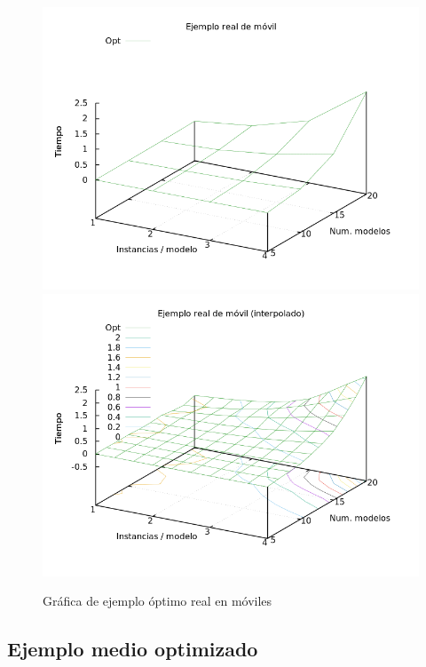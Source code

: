 \begin{figure}[H]
\centering
\includegraphics[scale=0.5]{img/opt-real}
\includegraphics[scale=0.5]{img/opt-real-spl}
\caption{Gráfica de ejemplo óptimo real en móviles
\label{fig:grfoptreal}}
\end{figure}


\subsection{Ejemplo medio optimizado}

